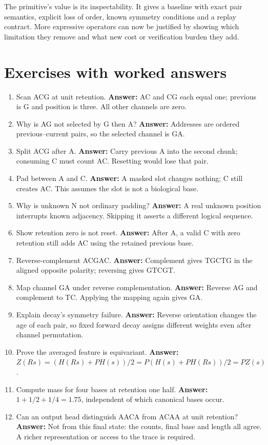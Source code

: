 The primitive's value is its inspectability. It gives a baseline with exact
pair semantics, explicit loss of order, known symmetry conditions and a replay
contract. More expressive operators can now be justified by showing which
limitation they remove and what new cost or verification burden they add.

\section{Exercises with worked answers}
\begin{enumerate}
\item Scan ACG at unit retention. \textbf{Answer:} AC and CG each equal
one; previous is G and position is three. All other channels are zero.
\item Why is AG not selected by G then A? \textbf{Answer:} Addresses are
ordered previous--current pairs, so the selected channel is GA.
\item Split ACG after A. \textbf{Answer:} Carry previous A into the
second chunk; consuming C must count AC. Resetting would lose that pair.
\item Pad between A and C. \textbf{Answer:} A masked slot changes
nothing; C still creates AC. This assumes the slot is not a biological base.
\item Why is unknown N not ordinary padding? \textbf{Answer:} A real
unknown position interrupts known adjacency. Skipping it asserts a different
logical sequence.
\item Show retention zero is not reset. \textbf{Answer:} After A, a
valid C with zero retention still adds AC using the retained previous base.
\item Reverse-complement ACGAC. \textbf{Answer:} Complement gives
TGCTG in the aligned opposite polarity; reversing gives GTCGT.
\item Map channel GA under reverse complementation. \textbf{Answer:}
Reverse AG and complement to TC. Applying the mapping again gives GA.
\item Explain decay's symmetry failure. \textbf{Answer:} Reverse orientation
changes the age of each pair, so fixed forward decay assigns different weights
even after channel permutation.
\item Prove the averaged feature is equivariant. \textbf{Answer:}
$Z(Rs)=(H(Rs)+PH(s))/2=P(H(s)+PH(Rs))/2=PZ(s)$.
\item Compute mass for four bases at retention one half.
\textbf{Answer:} $1+1/2+1/4=1.75$, independent of which canonical bases occur.
\item Can an output head distinguish AACA from ACAA at unit retention?
\textbf{Answer:} Not from this final state: the counts, final base and
length all agree. A richer representation or access to the trace is required.
\end{enumerate}

